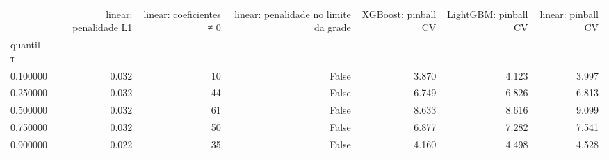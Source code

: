\begin{tabular}{lrrrrrr}
\toprule
 & linear: penalidade L1 & linear: coeficientes ≠ 0 & linear: penalidade no limite da grade & XGBoost: pinball CV & LightGBM: pinball CV & linear: pinball CV \\
quantil τ &  &  &  &  &  &  \\
\midrule
0.100000 & 0.032 & 10 & False & 3.870 & 4.123 & 3.997 \\
0.250000 & 0.032 & 44 & False & 6.749 & 6.826 & 6.813 \\
0.500000 & 0.032 & 61 & False & 8.633 & 8.616 & 9.099 \\
0.750000 & 0.032 & 50 & False & 6.877 & 7.282 & 7.541 \\
0.900000 & 0.022 & 35 & False & 4.160 & 4.498 & 4.528 \\
\bottomrule
\end{tabular}
